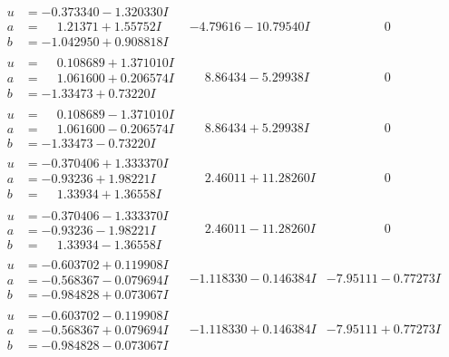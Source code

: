 \documentclass[1p]{elsarticle_modified}
\theoremstyle{definition}
\begin{document}
$$\begin{array}{c|c|c}
\begin{aligned}
u &= -0.373340 - 1.320330 I \\
a &= \phantom{-}1.21371 + 1.55752 I \\
b &= -1.042950 + 0.908818 I\end{aligned}
 & -4.79616 - 10.79540 I & \phantom{-0.000000 } 0 \\ \hline\begin{aligned}
u &= \phantom{-}0.108689 + 1.371010 I \\
a &= \phantom{-}1.061600 + 0.206574 I \\
b &= -1.33473 + 0.73220 I\end{aligned}
 & \phantom{-}8.86434 - 5.29938 I & \phantom{-0.000000 } 0 \\ \hline\begin{aligned}
u &= \phantom{-}0.108689 - 1.371010 I \\
a &= \phantom{-}1.061600 - 0.206574 I \\
b &= -1.33473 - 0.73220 I\end{aligned}
 & \phantom{-}8.86434 + 5.29938 I & \phantom{-0.000000 } 0 \\ \hline\begin{aligned}
u &= -0.370406 + 1.333370 I \\
a &= -0.93236 + 1.98221 I \\
b &= \phantom{-}1.33934 + 1.36558 I\end{aligned}
 & \phantom{-}2.46011 + 11.28260 I & \phantom{-0.000000 } 0 \\ \hline\begin{aligned}
u &= -0.370406 - 1.333370 I \\
a &= -0.93236 - 1.98221 I \\
b &= \phantom{-}1.33934 - 1.36558 I\end{aligned}
 & \phantom{-}2.46011 - 11.28260 I & \phantom{-0.000000 } 0 \\ \hline\begin{aligned}
u &= -0.603702 + 0.119908 I \\
a &= -0.568367 - 0.079694 I \\
b &= -0.984828 + 0.073067 I\end{aligned}
 & -1.118330 - 0.146384 I & -7.95111 - 0.77273 I \\ \hline\begin{aligned}
u &= -0.603702 - 0.119908 I \\
a &= -0.568367 + 0.079694 I \\
b &= -0.984828 - 0.073067 I\end{aligned}
 & -1.118330 + 0.146384 I & -7.95111 + 0.77273 I \\ \hline\begin{aligned}

\end{aligned}
\end{array}$$
\end{document}
